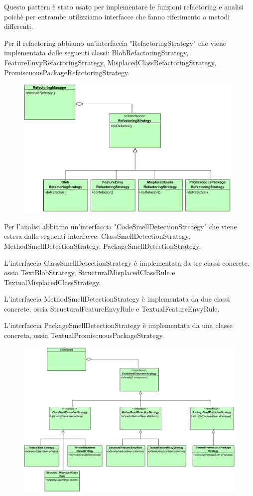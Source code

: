 \documentclass[11pt]{article}
\begin{document}
		Questo pattern è stato usato per implementare le funzioni refactoring e analisi poichè per entrambe utilizziamo interfacce che fanno riferimento a metodi differenti. 
		\newline 
		
		Per il refactoring abbiamo un'interfaccia "RefactoringStrategy" che viene implementata dalle
		seguenti classi: BlobRefactoringStrategy, FeatureEnvyRefactoringStrategy, MisplacedClassRefactoringStrategy, PromiscuousPackageRefactoringStrategy.
		
		 \begin{figure}[!h]
			\centering
			\includegraphics[width=11cm]{diagrams/RefactorStrategy}
		\end{figure}
	
			
		Per l'analisi abbiamo un'interfaccia "CodeSmellDetectionStrategy" che viene estesa dalle seguenti interfacce: ClassSmellDetectionStrategy, MethodSmellDetectionStrategy, PackageSmellDetectionStrategy.
		
		L'interfaccia ClassSmellDetectionStrategy è implementata da tre classi concrete, ossia TextBlobStrategy, StructuralMisplacedClassRule e TextualMisplacedClassStrategy.	
		
		L'interfaccia MethodSmellDetectionStrategy è implementata da due classi concrete, ossia StructuralFeatureEnvyRule e TextualFeatureEnvyRule. 
		
		L'interfaccia PackageSmellDetectionStrategy è implementata da una classe concreta, ossia TextualPromiscuousPackageStrategy.
		
		 \begin{figure}[!h]
			\centering
			\includegraphics[width=15cm]{diagrams/AnalysisStrategy}
		\end{figure}	
	
\end{document}
